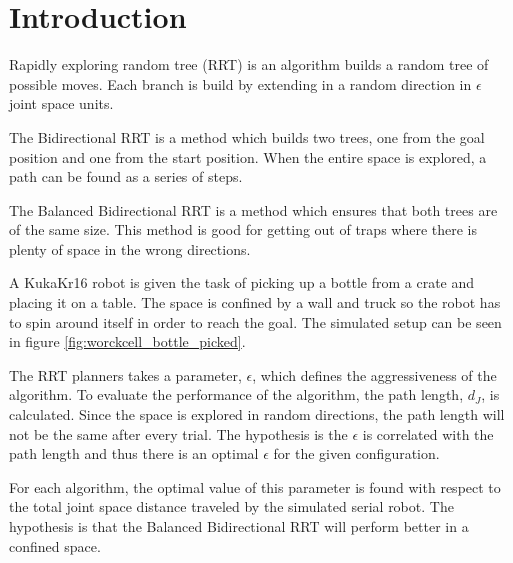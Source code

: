 \section{Introduction} 

Rapidly exploring random tree (RRT) is an algorithm builds a random tree of possible
moves. Each branch is build by extending in a random direction in \(\epsilon\) joint space units.  

The Bidirectional RRT is a method which builds two trees, one from the goal position and one from the start position. 
When the entire space is explored, a path can be found as a series of steps.

The Balanced Bidirectional RRT is a method which ensures that both trees are of the same size. 
This method is good for getting out of traps where there is plenty of space in the wrong directions.

A KukaKr16 robot is given the task of picking up a bottle from a crate and placing it on a table.
The space is confined by a wall and truck so the robot has to spin around itself in order to reach the goal.
The simulated setup can be seen in figure \ref{fig:worckcell_bottle_picked}.

The RRT planners takes a parameter, \(\epsilon\), which defines the aggressiveness of the algorithm.
To evaluate the performance of the algorithm, the path length, \(d_J\), is calculated.
Since the space is explored in random directions, the path length will not be the same after every trial.
The hypothesis is the \(\epsilon\) is correlated with the path length and thus there is an optimal \(\epsilon\) for the given configuration.

For each algorithm, the optimal value of this parameter is found with respect to the total joint space distance traveled by the simulated serial robot.
The hypothesis is that the Balanced Bidirectional RRT will perform better in a confined space. %